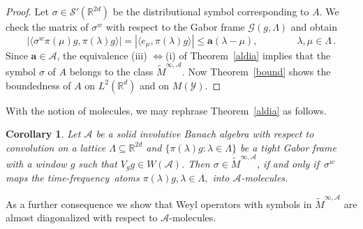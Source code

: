 \documentclass[12pt]{amsart}
\newtheorem{corollary}{Corollary}[section]
\theoremstyle{definition}
\theoremstyle{remark}
\numberwithin{equation}{section}
\newcommand{\tf}{time-frequency}
\newcommand{\symbo}{\widetilde M^{\infty, \cA}}
\def\cS{\mathcal{S}}
\def\cG{\mathcal{G}}
\def\cA{\mathcal{A}}
\def\cY{\mathcal{Y}}
\def\bR{{\mathbb{R}}}
\def\rd{\bR^d}
\def\rdd{{\bR^{2d}}}
\def\lrd{L^2(\rd)}
\def\cS{\mathcal{S}}
\def\cG{\mathcal{G}}
\def\cA{\mathcal{A}}
\newcommand{\fif}{if and only if}
\newcommand{\Cal}{\mathcal}
\newcommand{\ac}{\Cal A}
\begin{document}
\begin{proof}


Let $\sigma \in \cS '(\rdd )$ be the distributional  symbol corresponding to $A$. 
We check the matrix of $\sigma ^w$ with respect to the Gabor frame
$\cG (g, \Lambda )$ and obtain 
$$
|\langle \sigma ^w \pi (\mu ) g, \pi (\lambda ) g\rangle | = |\langle
e_\mu , \pi (\lambda )g\rangle | \leq \mathbf{a}(\lambda - \mu ),
\qquad \qquad \lambda , \mu \in \Lambda \, .
$$
Since $\mathbf{a}\in \cA $, the equivalence (iii) $\Leftrightarrow
$(i) of Theorem~\ref{aldia}  implies that the symbol $\sigma $ of $A$
belongs to the class $\symbo$. Now Theorem~\ref{bound} shows the
boundedness of $A$ on $\lrd $ and on $M(\cY )$. 
\end{proof}

With the notion of molecules, we may rephrase Theorem~\ref{aldia}
as
follows.


\begin{corollary}
  Let $\ac$ be a solid involutive Banach algebra with  respect to
  convolution   on a lattice $\Lambda \subseteq \rdd $ and $\{\pi
  (\lambda ) g: \lambda \in \Lambda \}$ be a tight Gabor frame with a window
  $g$ such that $V_gg\in W(\ac)$. Then $\sigma
  \in \widetilde M^{\infty, \cA }$, \fif\ $\sigma^w$ maps the \tf\ atoms
  $\pi (\lambda )g, \lambda \in \Lambda ,$ into $\cA $-molecules.
\end{corollary}

 As a further  consequence we show that  Weyl operators with symbols
 in $\widetilde M^{\infty , \cA }$  are almost diagonalized with
   respect to $\cA $-molecules.
\end{document}
